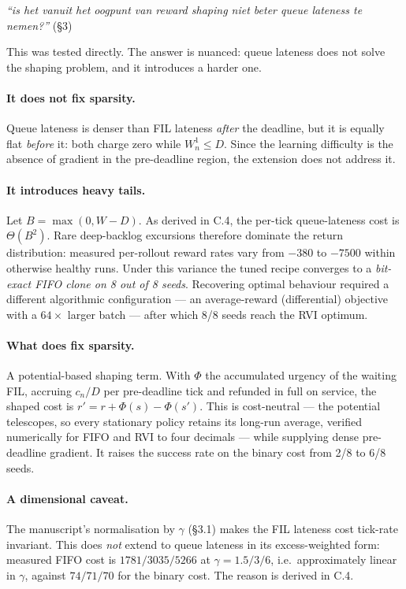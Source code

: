 \documentclass[11pt,a4paper]{article}
\newcommand{\comment}[1]{\textcolor{red!70!black}{\textit{``#1''}}}
\begin{document}
\comment{is het vanuit het oogpunt van reward shaping niet beter queue lateness
te nemen?} \hfill (\S3)

This was tested directly.  The answer is nuanced: queue lateness does not solve
the shaping problem, and it introduces a harder one.

\paragraph{It does not fix sparsity.}
Queue lateness is denser than FIL lateness \emph{after} the deadline, but it is
equally flat \emph{before} it: both charge zero while $W_n^1 \le D$.  Since the
learning difficulty is the absence of gradient in the pre-deadline region, the
extension does not address it.

\paragraph{It introduces heavy tails.}
Let $B = \max(0, W - D)$.  As derived in C.4, the per-tick queue-lateness cost
is $\Theta(B^2)$.  Rare deep-backlog excursions therefore dominate the return
distribution: measured per-rollout reward rates vary from $-380$ to $-7500$
within otherwise healthy runs.  Under this variance the tuned recipe converges
to a \emph{bit-exact FIFO clone on 8 out of 8 seeds}.  Recovering optimal
behaviour required a different algorithmic configuration --- an average-reward
(differential) objective with a $64\times$ larger batch --- after which 8/8 seeds
reach the RVI optimum.

\paragraph{What does fix sparsity.}
A potential-based shaping term.  With $\Phi$ the accumulated urgency of the
waiting FIL, accruing $c_n/D$ per pre-deadline tick and refunded in full on
service, the shaped cost is $r' = r + \Phi(s) - \Phi(s')$.  This is
cost-neutral --- the potential telescopes, so every stationary policy retains its
long-run average, verified numerically for FIFO and RVI to four decimals --- while
supplying dense pre-deadline gradient.  It raises the success rate on the binary
cost from 2/8 to 6/8 seeds.

\paragraph{A dimensional caveat.}
The manuscript's normalisation by $\gamma$ (\S3.1) makes the FIL lateness cost
tick-rate invariant.  This does \emph{not} extend to queue lateness in its
excess-weighted form: measured FIFO cost is $1781 / 3035 / 5266$ at
$\gamma = 1.5 / 3 / 6$, i.e.\ approximately linear in $\gamma$, against
$74 / 71 / 70$ for the binary cost.  The reason is derived in C.4.
\end{document}
